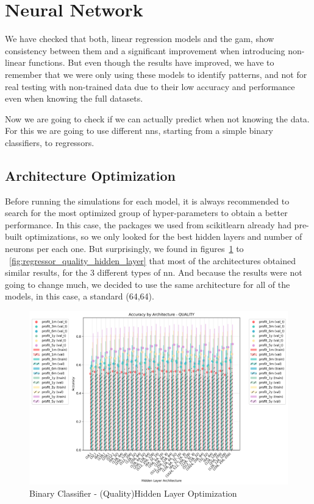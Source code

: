 \documentclass[11pt,english,a4paper,hidelinks]{book}
\begin{document}
\section{Neural Network}

We have checked that both, linear regression models and the \acrshort{gam}, show consistency between them and a significant improvement when introducing non-linear functions. But even though the results have improved, we have to remember that we were only using these models to identify patterns, and not for real testing with non-trained data due to their low accuracy and performance even when knowing the full datasets.

\vspace{0.5cm}

\noindent Now we are going to check if we can actually predict when not knowing the data. For this we are going to use different \acrshort{nn}s, starting from a simple binary classifiers, to regressors.

\subsection{Architecture Optimization}

Before running the simulations for each model, it is always recommended to search for the most optimized group of hyper-parameters to obtain a better performance. In this case, the packages we used from \acrshort{scikitlearn} already had pre-built optimizations, so we only looked for the best hidden layers and number of neurons per each one. But surprisingly, we found in figures~\ref{fig:binary_quality_hidden_layer} to ~\ref{fig:regressor_quality_hidden_layer} that most of the architectures obtained similar results, for the 3 different types of \acrshort{nn}. And because the results were not going to change much, we decided to use the same architecture for all of the models, in this case, a standard (64,64).

\begin{figure}[H]
    \centering
    \includegraphics[width=1\textwidth]{images/code/models/neural_network/binary_classifier_nn/class_architecture_analysis_quality.png}
    \caption{Binary Classifier - (Quality)Hidden Layer Optimization}
    \label{fig:binary_quality_hidden_layer}
\end{figure}
\end{document}
